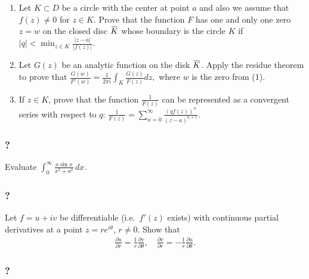 \begin{enumerate}
\def\labelenumi{(\arabic{enumi})}
\item
  Let \(K\subset D\) be a circle with the center at point \(a\) and also
  we assume that \(f(z)\not =0\) for \(z\in K\). Prove that the function
  \(F\) has one and only one zero \(z=w\) on the closed disc
  \(\mkern 1.5mu\overline{\mkern-1.5muK\mkern-1.5mu}\mkern 1.5mu\) whose
  boundary is the circle \(K\) if
  \(\displaystyle{ |q|<\min_{z\in K} \frac{|z-a|}{|f(z)|}.}\)\\
\item
  Let \(G(z)\) be an analytic function on the disk
  \(\mkern 1.5mu\overline{\mkern-1.5muK\mkern-1.5mu}\mkern 1.5mu\).
  Apply the residue theorem to prove that
  \(\displaystyle{ \frac{G(w)}{F'(w)}=\frac{1}{2\pi i}\int_K \frac{G(z)}{F(z)} dz,}\)
  where \(w\) is the zero from (1).\\
\item
  If \(z\in K\), prove that the function
  \(\displaystyle{\frac{1}{F(z)}}\) can be represented as a convergent
  series with respect to \(q\):
  \(\displaystyle{ \frac{1}{F(z)}=\sum_{n=0}^{\infty} \frac{(qf(z))^n}{(z-a)^{n+1}}.}\)
\end{enumerate}

\hypertarget{section-110}{%
\subsubsection{?}\label{section-110}}

Evaluate
\(\displaystyle{ \int_{0}^{\infty}\frac{x\sin x}{x^2+a^2} \, dx }\).

\hypertarget{section-111}{%
\subsubsection{?}\label{section-111}}

Let \(f=u+iv\) be differentiable (i.e.~\(f'(z)\) exists) with continuous
partial derivatives at a point \(z=re^{i\theta}\), \(r\not= 0\). Show
that
\begin{align*}\frac{\partial u}{\partial r}=\frac{1}{r}\frac{\partial v}{\partial \theta},\quad
\frac{\partial v}{\partial r}=-\frac{1}{r}\frac{\partial u}{\partial \theta}.\end{align*}

\hypertarget{section-112}{%
\subsubsection{?}\label{section-112}}

